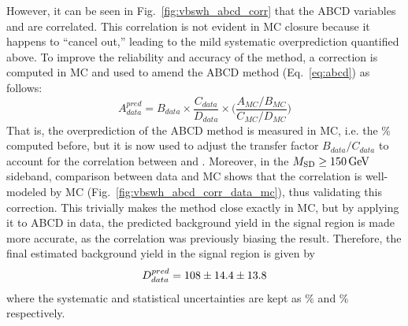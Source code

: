However, it can be seen in Fig.~\ref{fig:vbswh_abcd_corr} that the ABCD variables \detajj and \MSD are correlated.
This correlation is not evident in MC closure because it happens to ``cancel out,'' leading to the mild systematic overprediction quantified above. 
To improve the reliability and accuracy of the method, a correction is computed in MC and used to amend the ABCD method (Eq.~\ref{eq:abcd}) as follows:
\begin{equation}
    A_{data}^{pred} = B_{data}\times\frac{C_{data}}{D_{data}}\times\bigg(\frac{A_{MC}/B_{MC}}{C_{MC}/D_{MC}}\bigg)
\end{equation}
That is, the overprediction of the ABCD method is measured in MC, i.e. the \BkgEstTotalSystErr\% computed before, but it is now used to adjust the transfer factor $B_{data}/C_{data}$ to account for the correlation between \MSD and \detajj. 
Moreover, in the $M_{\mathrm{SD}} \geq 150 \,\text{Ge\hspace{-.08em}V}$ sideband, comparison between data and MC shows that the correlation is well-modeled by MC (Fig.~\ref{fig:vbswh_abcd_corr_data_mc}), thus validating this correction. 
This trivially makes the method close exactly in MC, but by applying it to ABCD in data, the predicted background yield in the signal region is made more accurate, as the correlation was previously biasing the result.
Therefore, the final estimated background yield in the signal region is given by
\begin{equation*}
    D_{data}^{pred} = 108 \pm 14.4 \pm 13.8
\end{equation*}
where the systematic and statistical uncertainties are kept as \BkgEstTotalSystErr\% and \BkgEstStatErr\% respectively.


